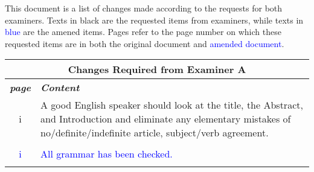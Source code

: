 \documentclass[12pt]{article}
\begin{document}
    This document is a list of changes made according to the requests for both examiners. Texts in black are the requested items from examiners, while texts in \textcolor{blue}{blue} are the amened items. Pages refer to the page number on which these requested items are in both the original document and \textcolor{blue}{amended document}.\\
    \newline
    \newline
    \begin{center}
    \begin{tabularx}{\linewidth}{ c | X }


    \multicolumn{2}{c}{\textbf{Changes Required from Examiner A}} \\
    \hline
    \hline
    \textbf{\textit{page}} & \textbf{\textit{Content}} \\
    \hline

       i & A good English speaker should look at the title, the Abstract, and Introduction and eliminate any
    elementary mistakes of no/definite/indefinite article, subject/verb agreement.\\
    & \\
       \textcolor{blue}{i} & \textcolor{blue}{All grammar has been checked.} \\
       & \\
    \hline


\end{tabularx}
\end{center}
\end{document}
